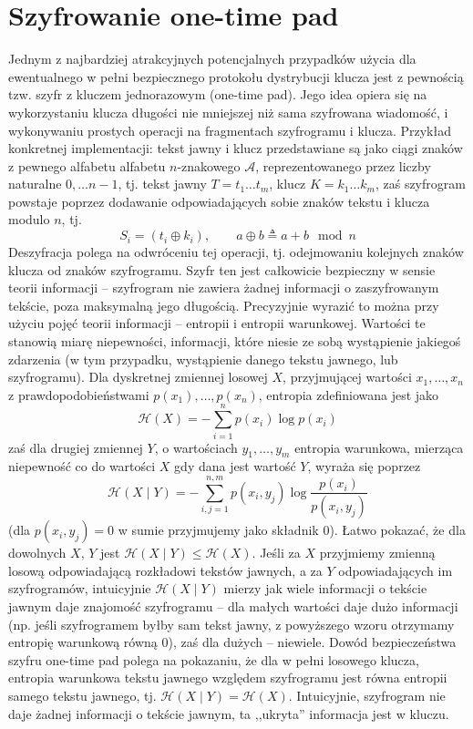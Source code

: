 \documentclass[10pt]{article}
\begin{document}


\section{Szyfrowanie one-time pad}
\label{one-time-pad}

Jednym z najbardziej atrakcyjnych potencjalnych przypadków użycia dla ewentualnego w pełni bezpiecznego
protokołu dystrybucji klucza jest z pewnością tzw. szyfr z kluczem jednorazowym (one-time pad). Jego
idea opiera się na wykorzystaniu klucza długości nie mniejszej niż sama szyfrowana wiadomość, i
wykonywaniu prostych operacji na fragmentach szyfrogramu i klucza. Przykład konkretnej implementacji:
tekst jawny i klucz przedstawiane są jako ciągi znaków z pewnego alfabetu alfabetu \(n\)-znakowego 
\(\mathcal{A}\), reprezentowanego przez liczby naturalne \(0,\ldots n-1\), tj. tekst jawny 
\(T=t_1\ldots t_m\), klucz \(K=k_1\ldots k_m\), zaś szyfrogram powstaje poprzez dodawanie odpowiadających
sobie znaków tekstu i klucza modulo \(n\), tj.
\[
S_i=\left(t_i\oplus k_i\right),\qquad a\oplus b \triangleq a+b \mod n
\]
Deszyfracja polega na odwróceniu tej operacji, tj. odejmowaniu kolejnych znaków klucza od znaków
szyfrogramu. Szyfr ten jest całkowicie bezpieczny w sensie teorii informacji -- szyfrogram nie zawiera
żadnej informacji o zaszyfrowanym tekście, poza maksymalną jego długością\cite{Shannon49}. Precyzyjnie
wyrazić to można przy użyciu pojęć teorii informacji -- entropii i entropii warunkowej. Wartości te 
stanowią miarę niepewności, informacji, które niesie ze sobą wystąpienie jakiegoś zdarzenia (w tym
przypadku, wystąpienie danego tekstu jawnego, lub szyfrogramu).
Dla dyskretnej zmiennej losowej \(X\), przyjmującej wartości \(x_1,\ldots,x_n\) z prawdopodobieństwami
\(p(x_1),\ldots,p(x_n)\), entropia zdefiniowana jest jako
\[
\mathcal{H}(X)=-\sum_{i=1}^n p(x_i)\log p(x_i)
\]
zaś dla drugiej zmiennej \(Y\), o wartościach \(y_1,\ldots,y_m\) entropia warunkowa, mierząca niepewność
co do wartości \(X\) gdy dana jest wartość \(Y\), wyraża się poprzez
\[
\mathcal{H}(X\mid Y)=-\sum_{i,j=1}^{n,m}p(x_i,y_j)\log \frac{p(x_i)}{p(x_i,y_j)}
\]
(dla \(p(x_i,y_j)=0\) w sumie przyjmujemy jako składnik \(0\)). Łatwo pokazać, że dla dowolnych \(X\),
\(Y\) jest \(\mathcal{H}(X\mid Y)\leq \mathcal{H}(X)\). Jeśli za \(X\) przyjmiemy zmienną losową
odpowiadającą rozkładowi tekstów jawnych, a za \(Y\) odpowiadających im szyfrogramów, intuicyjnie
\(\mathcal{H}(X\mid Y)\) mierzy jak wiele informacji o tekście jawnym daje znajomość szyfrogramu --
dla małych wartości daje dużo informacji (np. jeśli szyfrogramem byłby sam tekst jawny, z powyższego
wzoru otrzymamy entropię warunkową równą \(0\)), zaś dla dużych -- niewiele. Dowód bezpieczeństwa szyfru
one-time pad polega na pokazaniu, że dla w pełni losowego klucza, entropia warunkowa tekstu jawnego
względem szyfrogramu jest równa entropii samego tekstu jawnego, tj. 
\(\mathcal{H}(X\mid Y) = \mathcal{H}(X)\). Intuicyjnie, szyfrogram nie daje żadnej informacji o tekście
jawnym, ta ,,ukryta'' informacja jest w kluczu.
\end{document}
